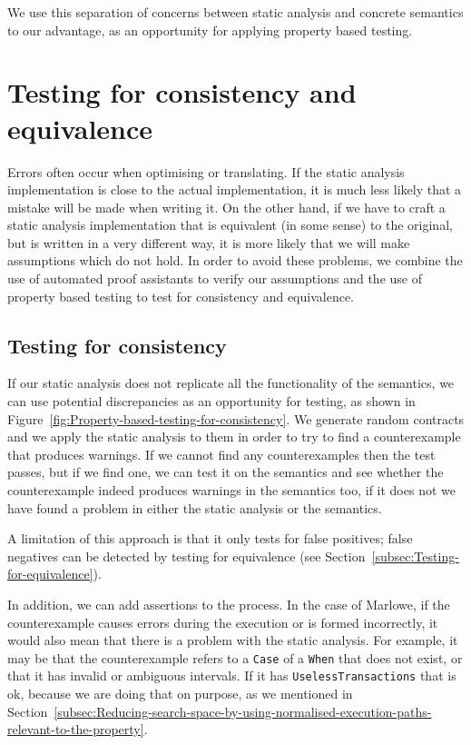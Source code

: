 \documentclass[english,runningheads]{llncs}
\begin{document}
We use this separation of concerns between static analysis and
concrete semantics to our advantage, as an opportunity for applying
property based testing.%

\section{Testing for consistency and equivalence\label{sec:Testing}}

Errors often occur when optimising or translating. If the static analysis
implementation is close to the actual implementation, it is much less
likely that a mistake will be made when writing it. On the other hand,
if we have to craft a static analysis implementation that is equivalent
(in some sense) to the original, but is written in a very different
way, it is more likely that we will make assumptions which do not
hold.
In order to avoid these problems, we combine the use of automated proof
assistants to verify our assumptions and the use of property based testing to
test for consistency and equivalence. %

\subsection{Testing for consistency\label{subsec:Testing-for-consistency} }

If our static analysis does not replicate all the functionality of
the semantics, we can use potential discrepancies as an opportunity
for testing, as shown in Figure~\ref{fig:Property-based-testing-for-consistency}.
We generate random contracts and we apply the static analysis to them
in order to try to find a counterexample that produces warnings. If
we cannot find any counterexamples then the test passes, but if we
find one, we can test it on the semantics and see whether the counterexample
indeed produces warnings in the semantics too, if it does not we have
found a problem in either the static analysis or the semantics.

A limitation of this approach is that it only tests for false positives; 
false negatives can be detected by testing
for equivalence (see Section~\ref{subsec:Testing-for-equivalence}).

In addition, we can add assertions to the process. In the case of
Marlowe, if the counterexample causes errors during the execution or is
formed incorrectly, it would also mean that there is a problem with
the static analysis. For example, it may be that the counterexample
refers to a \texttt{Case} of a \texttt{When} that does not exist,
or that it has invalid or ambiguous intervals. If it has \texttt{UselessTransactions}
that is ok, because we are doing that on purpose, as we mentioned in Section~\ref{subsec:Reducing-search-space-by-using-normalised-execution-paths-relevant-to-the-property}.
\end{document}

